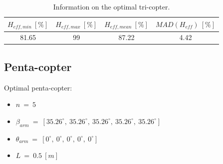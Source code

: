 \begin{table}[!h]
 \caption{Information on the optimal tri-copter.}\vspace{1ex}
 \label{tab:tab_Tri_metrics}
 \begin{center}
 {\tiny\begin{tabular}{|cccc|}
 \hline
  $H_{eff,min}\ [\%]$ & $H_{eff,max}\ [\%]$ & $H_{eff,mean}\ [\%]$
  & $MAD(H_{eff})\ [\%]$\\ \hline
  81.65 & 99 & 87.22 & 4.42\\
 \hline
\end{tabular}}
\end{center}
\end{table}

\subsection{Penta-copter}
\label{sec:penta_copter}
Optimal penta-copter:
\begin{itemize}
  \item $n\ =\ 5$
  \item $\beta_{arm}\ =\ [35.26^{\circ},\  35.26^{\circ},\  35.26^{\circ},\  35.26^{\circ},\   35.26^{\circ}]$
  \item $\theta_{arm}\ =\ [0^{\circ},\  0^{\circ},\  0^{\circ},\  0^{\circ},\  0^{\circ}]$
  \item $L\ =\ 0.5\ [m]$
\end{itemize}

